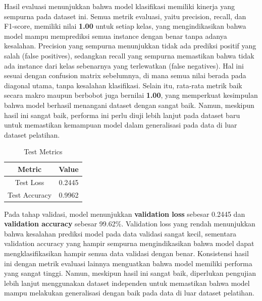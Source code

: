 \documentclass[12pt,a4paper]{article}
\begin{document}
Hasil evaluasi menunjukkan bahwa model klasifikasi memiliki kinerja yang sempurna pada dataset ini. Semua metrik evaluasi, yaitu precision, recall, dan F1-score, memiliki nilai \textbf{1.00} untuk setiap kelas, yang mengindikasikan bahwa model mampu memprediksi semua instance dengan benar tanpa adanya kesalahan. Precision yang sempurna menunjukkan tidak ada prediksi positif yang salah (false positives), sedangkan recall yang sempurna memastikan bahwa tidak ada instance dari kelas sebenarnya yang terlewatkan (false negatives). Hal ini sesuai dengan confusion matrix sebelumnya, di mana semua nilai berada pada diagonal utama, tanpa kesalahan klasifikasi. Selain itu, rata-rata metrik baik secara makro maupun berbobot juga bernilai \textbf{1.00}, yang memperkuat kesimpulan bahwa model berhasil menangani dataset dengan sangat baik. Namun, meskipun hasil ini sangat baik, performa ini perlu diuji lebih lanjut pada dataset baru untuk memastikan kemampuan model dalam generalisasi pada data di luar dataset pelatihan.

\begin{table}[ht]
\centering
\begin{tabular}{|c|c|}
\hline
\textbf{Metric} & \textbf{Value} \\ \hline
Test Loss       & 0.2445         \\ \hline
Test Accuracy   & 0.9962         \\ \hline
\end{tabular}
\caption{Test Metrics}
\label{tab:test_metrics}
\end{table}

Pada tahap validasi, model menunjukkan \textbf{validation loss} sebesar 0.2445 dan \textbf{validation accuracy} sebesar 99.62\%. Validation loss yang rendah menunjukkan bahwa kesalahan prediksi model pada data validasi sangat kecil, sementara validation accuracy yang hampir sempurna mengindikasikan bahwa model dapat mengklasifikasikan hampir semua data validasi dengan benar. Konsistensi hasil ini dengan metrik evaluasi lainnya menguatkan bahwa model memiliki performa yang sangat tinggi. Namun, meskipun hasil ini sangat baik, diperlukan pengujian lebih lanjut menggunakan dataset independen untuk memastikan bahwa model mampu melakukan generalisasi dengan baik pada data di luar dataset pelatihan.
\end{document}
